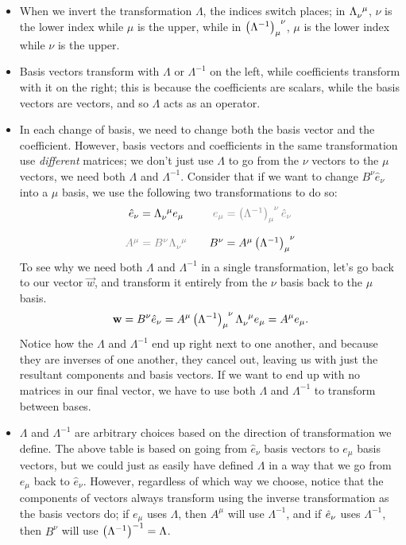 \begin{itemize}
    \item When we invert the transformation $\Lambda$, the indices switch places; in $\tensor{\Lambda}{_\nu^\mu}$, $\nu$ is the lower index while $\mu$ is the upper, while in $\tensor{\left(\Lambda^{-1}\right)}{_\mu^\nu}$, $\mu$ is the lower index while $\nu$ is the upper.
    \item Basis vectors transform with $\Lambda$ or $\Lambda^{-1}$ on the left, while coefficients transform with it on the right; this is because the coefficients are scalars, while the basis vectors are vectors, and so $\Lambda$ acts as an operator.
    \item In each change of basis, we need to change both the basis vector and the coefficient. However, basis vectors and coefficients in the same transformation use \emph{different} matrices; we don't just use $\Lambda$ to go from the $\nu$ vectors to the $\mu$ vectors, we need both $\Lambda$ and $\Lambda^{-1}$.
    Consider that if we want to change $B^\nu \hat{e}_\nu$ into a $\mu$ basis, we use the following two transformations to do so:
    \[
        \begin{matrix}
            \hat{e}_\nu = \tensor{\Lambda}{_\nu^\mu} e_\mu &  & \mathcolor{gray}{e_\mu = \tensor{\left(\Lambda^{-1}\right)}{_\mu^\nu}\hat{e}_\nu} \\
            & & \\
             \mathcolor{gray}{A^\mu = B^\nu\tensor{\Lambda}{_\nu^\mu}} & & B^\nu = A^\mu \tensor{\left(\Lambda^{-1}\right)}{_\mu^\nu}
        \end{matrix}
    \]
    To see why we need both $\Lambda$ and $\Lambda^{-1}$ in a single transformation, let's go back to our vector $\vec{w}$, and transform it entirely from the $\nu$ basis back to the $\mu$ basis.
    \[
        \vec{w} = B^\nu \hat{e}_\nu = A^\mu \tensor{\left(\Lambda^{-1}\right)}{_\mu^\nu} \tensor{\Lambda}{_\nu^\mu} e_\mu = A^\mu e_\mu.
    \]
    Notice how the $\Lambda$ and $\Lambda^{-1}$ end up right next to one another, and because they are inverses of one another, they cancel out, leaving us with just the resultant components and basis vectors.
    If we want to end up with no matrices in our final vector, we have to use both $\Lambda$ and $\Lambda^{-1}$ to transform between bases.
    \item $\Lambda$ and $\Lambda^{-1}$ are arbitrary choices based on the direction of transformation we define.
    The above table is based on going from $\hat{e}_\nu$ basis vectors to $e_\mu$ basis vectors, but we could just as easily have defined $\Lambda$ in a way that we go from $e_\mu$ back to $\hat{e}_\nu$.
    However, regardless of which way we choose, notice that the components of vectors always transform using the inverse transformation as the basis vectors do; if $e_\mu$ uses $\Lambda$, then $A^\mu$ will use $\Lambda^{-1}$, and if $\Hat{e}_\nu$ uses $\Lambda^{-1}$, then $B^\nu$ will use $\qty(\Lambda^{-1})^{-1} = \Lambda$.
\end{itemize}

